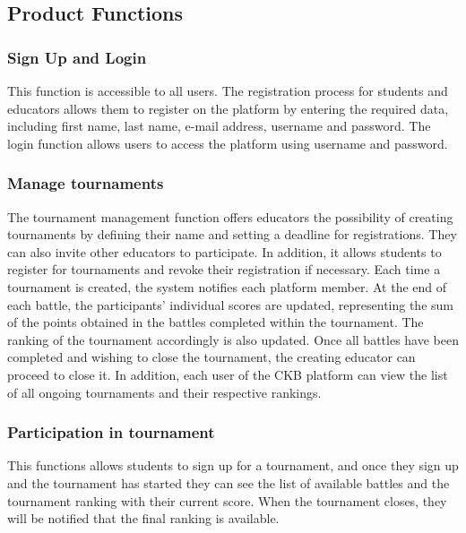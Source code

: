 \clearpage

\subsection{Product Functions}

\subsubsection{Sign Up and Login}
This function is accessible to all users.
The registration process for students and educators allows them to register on the platform by entering the required data, including first name, last name, e-mail address, username and password.
\newline
The login function allows users to access the platform using username and password.

\subsubsection{Manage tournaments}
The tournament management function offers educators the possibility of creating tournaments by defining their name and setting a deadline for registrations. They can also invite other educators to participate. In addition, it allows students to register for tournaments and revoke their registration if necessary.
\newline
Each time a tournament is created, the system notifies each platform member. At the end of each battle, the participants' individual scores are updated, representing the sum of the points obtained in the battles completed within the tournament. The ranking of the tournament accordingly is also updated.
\newline
Once all battles have been completed and wishing to close the tournament, the creating educator can proceed to close it. In addition, each user of the CKB platform can view the list of all ongoing tournaments and their respective rankings.

\subsubsection{Participation in tournament }
This functions allows students to sign up for a tournament, and once they sign up and the tournament has started they can see the list of available battles and the tournament ranking with their current score. When the tournament closes, they will be notified that the final ranking is available.

